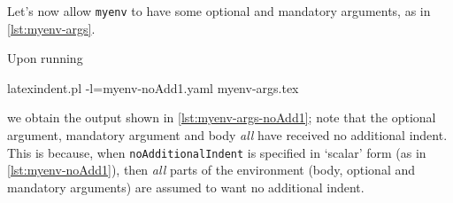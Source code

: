 \documentclass[10pt]{article}
\begin{document}
 \begin{example}
 Let's now allow \texttt{myenv} to have some optional and mandatory arguments, as in
 \cref{lst:myenv-args}.


 Upon running 

 \begin{commandshell}
latexindent.pl -l=myenv-noAdd1.yaml myenv-args.tex  
\end{commandshell}

 we obtain the output shown in \cref{lst:myenv-args-noAdd1}; note that the optional
 argument, mandatory argument and body \emph{all} have received no additional indent.
 This is because, when \texttt{noAdditionalIndent} is specified in `scalar' form (as in
 \cref{lst:myenv-noAdd1}), then \emph{all} parts of the environment (body, optional and
 mandatory arguments) are assumed to want no additional indent.
 \end{example}
\end{document}
